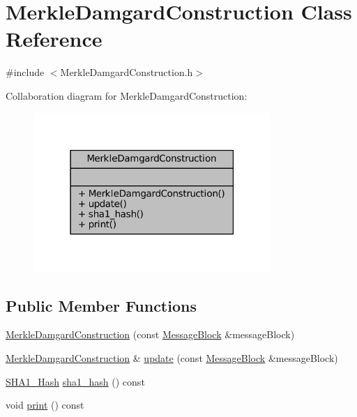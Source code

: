 \hypertarget{class_merkle_damgard_construction}{}\section{Merkle\+Damgard\+Construction Class Reference}
\label{class_merkle_damgard_construction}


{\ttfamily \#include $<$Merkle\+Damgard\+Construction.\+h$>$}



Collaboration diagram for Merkle\+Damgard\+Construction\+:
\nopagebreak
\begin{figure}[H]
\begin{center}
\leavevmode
\includegraphics[width=255pt]{class_merkle_damgard_construction__coll__graph}
\end{center}
\end{figure}
\subsection*{Public Member Functions}
\begin{DoxyCompactItemize}
\item 
\mbox{\hyperlink{class_merkle_damgard_construction_a120c6725de2bef54dd878fa16e3757e2}{Merkle\+Damgard\+Construction}} (const \mbox{\hyperlink{class_message_block}{Message\+Block}} \&message\+Block)
\item 
\mbox{\hyperlink{class_merkle_damgard_construction}{Merkle\+Damgard\+Construction}} \& \mbox{\hyperlink{class_merkle_damgard_construction_a58d9ed99998a3f4e53676cd26a8938f9}{update}} (const \mbox{\hyperlink{class_message_block}{Message\+Block}} \&message\+Block)
\item 
\mbox{\hyperlink{struct_s_h_a1___hash}{S\+H\+A1\+\_\+\+Hash}} \mbox{\hyperlink{class_merkle_damgard_construction_a1c0c74d79a8cd1a5615a4d1106480d61}{sha1\+\_\+hash}} () const
\item 
void \mbox{\hyperlink{class_merkle_damgard_construction_a4f96118b63e4c60d158af95e2f4dfbd4}{print}} () const
\end{DoxyCompactItemize}


